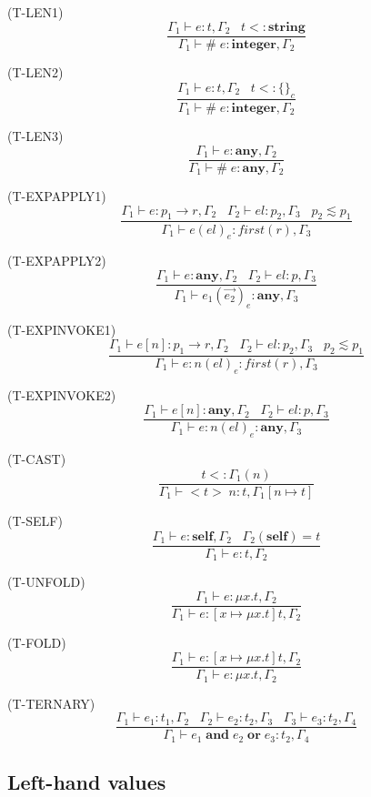 \documentclass{paper}
\newcommand{\Any}{\mathbf{any}}
\newcommand{\Self}{\mathbf{self}}
\newcommand{\Integer}{\mathbf{integer}}
\newcommand{\String}{\mathbf{string}}
\newcommand{\mylabel}[1]{\; (\textsc{#1})}
\newcommand{\env}{\Gamma}
\newcommand{\subtype}{<:}
\begin{document}
\mylabel{T-LEN1}
\[
\dfrac{\env_{1} \vdash e:t, \env_{2} \;\;\;
       t \subtype \String}
      {\env_{1} \vdash \# \; e:\Integer, \env_{2}}
\]

\mylabel{T-LEN2}
\[
\dfrac{\env_{1} \vdash e:t, \env_{2} \;\;\;
       t \subtype \{\}_{c}}
      {\env_{1} \vdash \# \; e:\Integer, \env_{2}}
\]

\mylabel{T-LEN3}
\[
\dfrac{\env_{1} \vdash e:\Any, \env_{2}}
      {\env_{1} \vdash \# \; e:\Any, \env_{2}}
\]

\mylabel{T-EXPAPPLY1}
\[
\dfrac{\env_{1} \vdash e:p_{1} \rightarrow r, \env_{2} \;\;\;
       \env_{2} \vdash el:p_{2}, \env_{3} \;\;\;
       p_{2} \lesssim p_{1}}
      {\env_{1} \vdash e(el)_{e}:first(r), \env_{3}}
\]

\mylabel{T-EXPAPPLY2}
\[
\dfrac{\env_{1} \vdash e:\Any, \env_{2} \;\;\;
       \env_{2} \vdash el:p, \env_{3}}
      {\env_{1} \vdash e_{1}(\vec{e_{2}})_{e}:\Any, \env_{3}}
\]

\mylabel{T-EXPINVOKE1}
\[
\dfrac{\env_{1} \vdash e[n]:p_{1} \rightarrow r, \env_{2} \;\;\;
       \env_{2} \vdash el:p_{2}, \env_{3} \;\;\;
       p_{2} \lesssim p_{1}}
      {\env_{1} \vdash e{:}n(el)_{e}:first(r), \env_{3}}
\]

\mylabel{T-EXPINVOKE2}
\[
\dfrac{\env_{1} \vdash e[n]:\Any, \env_{2} \;\;\;
       \env_{2} \vdash el:p, \env_{3}}
      {\env_{1} \vdash e{:}n(el)_{e}:\Any, \env_{3}}
\]

\mylabel{T-CAST}
\[
\dfrac{t \subtype \env_{1}(n)}
      {\env_{1} \vdash {<}t{>} \; n:t, \env_{1}[n \mapsto t]}
\]

\mylabel{T-SELF}
\[
\dfrac{\env_{1} \vdash e:\Self, \env_{2} \;\;\;
       \env_{2}(\Self) = t}
      {\env_{1} \vdash e:t, \env_{2}}
\]

\mylabel{T-UNFOLD}
\[
\dfrac{\env_{1} \vdash e:\mu x.t, \env_{2}}
      {\env_{1} \vdash e:[x \mapsto \mu x.t]t, \env_{2}}
\]

\mylabel{T-FOLD}
\[
\dfrac{\env_{1} \vdash e:[x \mapsto \mu x.t]t, \env_{2}}
      {\env_{1} \vdash e:\mu x.t, \env_{2}}
\]

\mylabel{T-TERNARY}
\[
\dfrac{\env_{1} \vdash e_{1}:t_{1}, \env_{2} \;\;\;
       \env_{2} \vdash e_{2}:t_{2}, \env_{3} \;\;\;
       \env_{3} \vdash e_{3}:t_{2}, \env_{4}}
      {\env_{1} \vdash e_{1} \; \mathbf{and} \; e_{2} \; \mathbf{or} \; e_{3}:t_{2}, \env_{4}}
\]

\subsection{Left-hand values}
\end{document}
